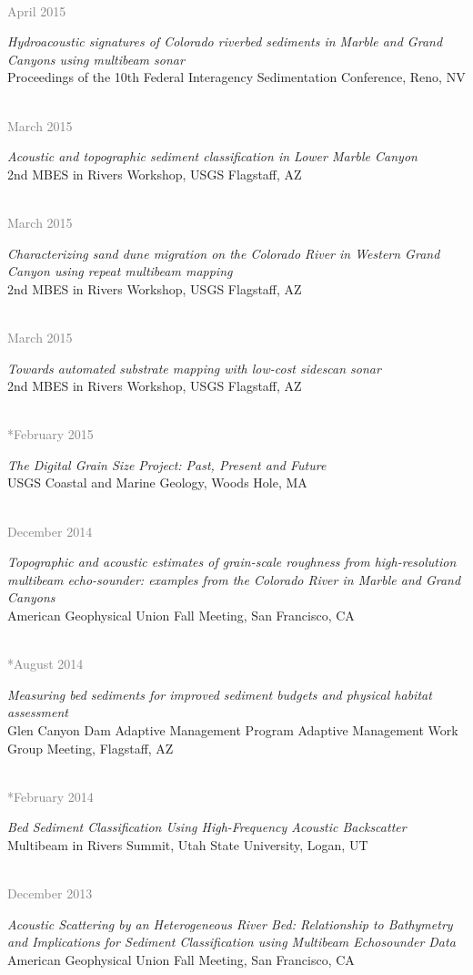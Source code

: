 \documentclass{article} %
\newlength\sidebarwidth
\newcommand{\dateonly}[2][]
	 {\begin{minipage}{\textwidth}
	 \vspace*{.4\baselineskip}
         \nopagebreak\hspace{0in}%
         \nopagebreak\begin{minipage}[t]{\sidebarwidth - .2cm}
         \raggedleft {~}
         {\\[-\baselineskip] \textcolor{gray}{\footnotesize #1}}
	 \end{minipage}%
	 \hfill
	 \begin{minipage}[t]{\linewidth - \sidebarwidth}
	 #2%
	 \end{minipage}%
	 \vspace*{.2\baselineskip plus 1\baselineskip minus
	 .2\baselineskip}%
	 \end{minipage}}
\begin{document}
  \dateonly[April 2015]{
      {\it Hydroacoustic signatures of Colorado riverbed sediments in Marble and Grand Canyons using multibeam sonar}\\
      Proceedings of the 10th Federal Interagency Sedimentation Conference, Reno, NV
  }

  \dateonly[March 2015]{
      {\it Acoustic and topographic sediment classification in Lower Marble Canyon}\\
      2nd MBES in Rivers Workshop, USGS Flagstaff, AZ
  }

  \dateonly[March 2015]{
      {\it Characterizing sand dune migration on the Colorado River in Western Grand Canyon using repeat multibeam mapping}\\
      2nd MBES in Rivers Workshop, USGS Flagstaff, AZ
  }

  \dateonly[March 2015]{
      {\it Towards automated substrate mapping with low-cost sidescan sonar}\\
      2nd MBES in Rivers Workshop, USGS Flagstaff, AZ
  }

  \dateonly[**February 2015]{
      {\it The Digital Grain Size Project: Past, Present and Future}\\
      USGS Coastal and Marine Geology, Woods Hole, MA
  }

  \dateonly[December 2014]{
      {\it Topographic and acoustic estimates of grain-scale roughness from high-resolution multibeam echo-sounder: examples from the Colorado River in Marble and Grand Canyons}\\
      American Geophysical Union Fall Meeting, San Francisco, CA
  }

  \dateonly[**August 2014]{
      {\it Measuring bed sediments for improved sediment budgets and physical habitat assessment}\\
      Glen Canyon Dam Adaptive Management Program Adaptive Management Work Group Meeting, Flagstaff, AZ
  }

  \dateonly[**February 2014]{
      {\it Bed Sediment Classification Using High-Frequency Acoustic Backscatter}\\
      Multibeam in Rivers Summit, Utah State University, Logan, UT
  }

  \dateonly[December 2013]{
      {\it Acoustic Scattering by an Heterogeneous River Bed: Relationship to Bathymetry and Implications for Sediment Classification using Multibeam Echosounder Data}\\
      American Geophysical Union Fall Meeting, San Francisco, CA
  }
\end{document}
